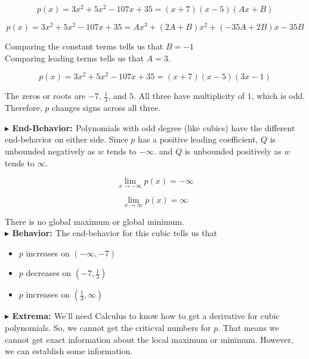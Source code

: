 \documentclass{ximera}
\begin{document}
\begin{exercise}
\[
p(x) = 3 x^2 + 5 x^2 - 107 x + 35 = (x+7)(x-5)(A x + B)
\]




\[
p(x) = 3 x^2 + 5 x^2 - 107 x + 35 = A x^3 + (2 A + B) x^2 + (-35 A + 2 B) x - 35 B 
\]


Comparing the constant terms tells us that $B = -1$ \\



Comparing leading terms tells us that $A = 3$.




\[
p(x) = 3 x^2 + 5 x^2 - 107 x + 35 = (x+7)(x-5)(3 x - 1)
\]





The zeros or roots are $-7$, $\frac{1}{3}$, and $5$.  All three have multiplicity of $1$, which is odd.  Therefore, $p$ changes signs across all three.










\textbf{\textcolor{blue!55!black}{$\blacktriangleright$ End-Behavior: }} Polynomials with odd degree (like cubics) have the different end-behavior on either side.  Since $p$ has a positive leading coefficient, $Q$ is unbounded negatively as $w$ tends to $-\infty$. and $Q$ is unbounded positively as $w$ tends to $\infty$.

\[
\lim\limits_{x \to -\infty} p(x) = -\infty
\]


\[
\lim\limits_{x \to \infty} p(x) = \infty
\]


There is no global maximum or global minimum. \\



\textbf{\textcolor{blue!55!black}{$\blacktriangleright$ Behavior: }}  The end-behavior for this cubic tells us that 



\begin{itemize}
\item $p$ increases on $(-\infty, -7)$ 
\item $p$ decreases on $\left( -7, \frac{1}{3} \right)$
\item $p$ increases on $\left( \frac{1}{3}, \infty \right)$
\end{itemize}




\textbf{\textcolor{blue!55!black}{$\blacktriangleright$ Extrema: }}  We'll need Calculus to know how to get a derivative for cubic polynomials.  So, we cannot get the criticval numbers for $p$.  That means we cannot get exact information about the local maximum or minimum.  However, we can establish some information.






\end{exercise}
\end{document}

